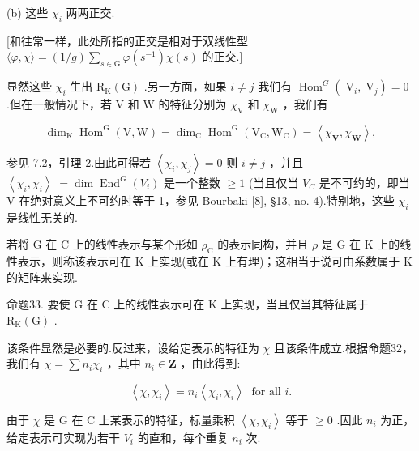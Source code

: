 \documentclass[10pt]{article}
\begin{document}
(b) 这些 \({\chi }_{i}\) 两两正交.

[和往常一样，此处所指的正交是相对于双线性型 \(\langle \varphi ,\chi \rangle  = \left( {1/g}\right) \mathop{\sum }\limits_{{s \in  \mathrm{G}}}\varphi \left( {s}^{-1}\right) \chi \left( s\right)\) 的正交.]

显然这些 \({\chi }_{i}\) 生出 \({\mathrm{R}}_{\mathrm{K}}\left( \mathrm{G}\right)\) .另一方面，如果 \(i \neq  j\) 我们有 \({\operatorname{Hom}}^{G}\left( {{\mathrm{\;V}}_{i},{\mathrm{\;V}}_{j}}\right)  = 0\) .但在一般情况下，若 \(\mathrm{V}\) 和 \(\mathrm{W}\) 的特征分别为 \({\chi }_{\mathrm{V}}\) 和 \({\chi }_{\mathrm{W}}\) ，我们有

\[
{\dim }_{\mathrm{K}}{\operatorname{Hom}}^{\mathrm{G}}\left( {\mathrm{V},\mathrm{W}}\right)  = {\dim }_{\mathrm{C}}{\operatorname{Hom}}^{\mathrm{G}}\left( {{\mathrm{V}}_{\mathrm{C}},{\mathrm{W}}_{\mathrm{C}}}\right)  = \left\langle  {{\chi }_{\mathbf{V}},{\chi }_{\mathbf{W}}}\right\rangle  ,
\]

参见 7.2，引理 2.由此可得若 \(\left\langle  {{\chi }_{i},{\chi }_{j}}\right\rangle   = 0\) 则 \(i \neq  j\) ，并且 \(\left\langle  {{\chi }_{i},{\chi }_{i}}\right\rangle \; = \dim {\operatorname{End}}^{G}\left( {V}_{i}\right)\) 是一个整数 \(\geq  1\) (当且仅当 \({V}_{C}\) 是不可约的，即当 V 在绝对意义上不可约时等于 1，参见 Bourbaki [8], §13, no. 4).特别地，这些 \({\chi }_{i}\) 是线性无关的.

若将 \(\mathrm{G}\) 在 \(\mathrm{C}\) 上的线性表示与某个形如 \({\rho }_{\mathrm{C}}\) 的表示同构，并且 \(\rho\) 是 \(\mathrm{G}\) 在 \(\mathrm{K}\) 上的线性表示，则称该表示可在 \(\mathrm{K}\) 上实现(或在 \(\mathrm{K}\) 上有理)；这相当于说可由系数属于 \(\mathrm{K}\) 的矩阵来实现.

命题33. 要使 \(\mathrm{G}\) 在 \(\mathrm{C}\) 上的线性表示可在 \(\mathrm{K}\) 上实现，当且仅当其特征属于 \({\mathrm{R}}_{\mathrm{K}}\left( \mathrm{G}\right)\) .

该条件显然是必要的.反过来，设给定表示的特征为 \(\chi\) 且该条件成立.根据命题32，我们有 \(\chi  = \sum {n}_{i}{\chi }_{i}\) ，其中 \({n}_{i} \in  \mathbf{Z}\) ，由此得到:

\[
\left\langle  {\chi ,{\chi }_{i}}\right\rangle   = {n}_{i}\left\langle  {{\chi }_{i},{\chi }_{i}}\right\rangle  \;\text{ for all }i.
\]

由于 \(\chi\) 是 \(\mathrm{G}\) 在 \(\mathrm{C}\) 上某表示的特征，标量乘积 \(\left\langle  {\chi ,{\chi }_{i}}\right\rangle\) 等于 \(\geq  0\) .因此 \({n}_{i}\) 为正，给定表示可实现为若干 \({V}_{i}\) 的直和，每个重复 \({n}_{i}\) 次.
\end{document}
